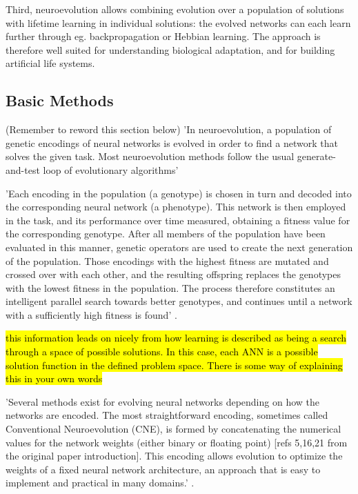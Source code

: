 Third, neuroevolution allows combining evolution over a population of solutions with lifetime learning in individual solutions: the evolved networks can each learn further through eg. backpropagation or Hebbian learning. The approach is therefore well suited for understanding biological adaptation, and for building artificial life systems.

\subsection{Basic Methods}
(Remember to reword this section below)
'In neuroevolution, a population of genetic encodings of neural networks is evolved in order to find a network that solves the given task. Most neuroevolution methods follow the usual generate-and-test loop of evolutionary algorithms' \cite{Miikkulainen2010}

'Each encoding in the population (a genotype) is chosen in turn and decoded into the corresponding neural network (a phenotype). This network is then employed in the task, and its performance over time measured, obtaining a fitness value for the corresponding genotype. After all members of the population have been evaluated in this manner, genetic operators are used to create the next generation of the population. Those encodings with the highest fitness are mutated and crossed over with each other, and the resulting offspring replaces the genotypes with the lowest fitness in the population. The process therefore constitutes an intelligent parallel search towards better genotypes, and continues until a network with a sufficiently high fitness is found' \cite{Miikkulainen2010}.

\hl{this information leads on nicely from how learning is described as being a search through a space of possible solutions. In this case, each ANN is a possible solution function in the defined problem space. There is some way of explaining this in your own words}


'Several methods exist for evolving neural networks depending on how the networks are encoded. The most straightforward encoding, sometimes called Conventional Neuroevolution (CNE), is formed by concatenating the numerical values for the network weights (either binary or floating point) [refs 5,16,21 from the original paper introduction]. This encoding allows evolution to optimize the weights of a fixed neural network architecture, an approach that is easy to implement and practical in many domains.' \cite{Miikkulainen2010}.

